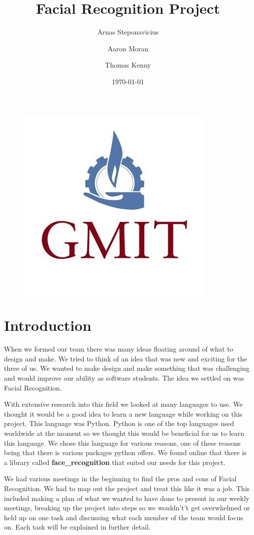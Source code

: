 \documentclass{article}
\begin{document}
\title{Facial Recognition Project}
\begin{figure}
    \centering
    \includegraphics[scale = 0.25]{gmit}
    \label{fig:gmit}
\end{figure}
\author{Arnas Steponavicius
        \and Aaron Moran
        \and Thomas Kenny}
\date{\today}

\maketitle
\section{Introduction}
When we formed our team there was many ideas floating around of what to design and make. We tried to think of an idea that was new and exciting for the three of us. We wanted to make design and make something that was challenging and would improve our ability as software students. The idea we settled on was Facial Recognition. 
    
With extensive research into this field we looked at many languages to use. We thought it would be a good idea to learn a new language while working on this project. This language was Python. 
Python is one of the top languages used worldwide at the moment so we thought this would be beneficial for us to learn this language. We chose this language for various reasons, one of these reasons being that there is various packages python offers. We found online that there is a library called \textbf{face\_recognition} that suited our needs for this project. 

We had various meetings in the beginning to find the pros and cons of Facial Recognition. We had to map out the project and treat this like it was a job. This included making a plan of what we wanted to have done to present in our weekly meetings, breaking up the project into steps so we wouldn't’t get overwhelmed or held up on one task and discussing what each member of the team would focus on. Each task will be explained in further detail.
\end{document}
